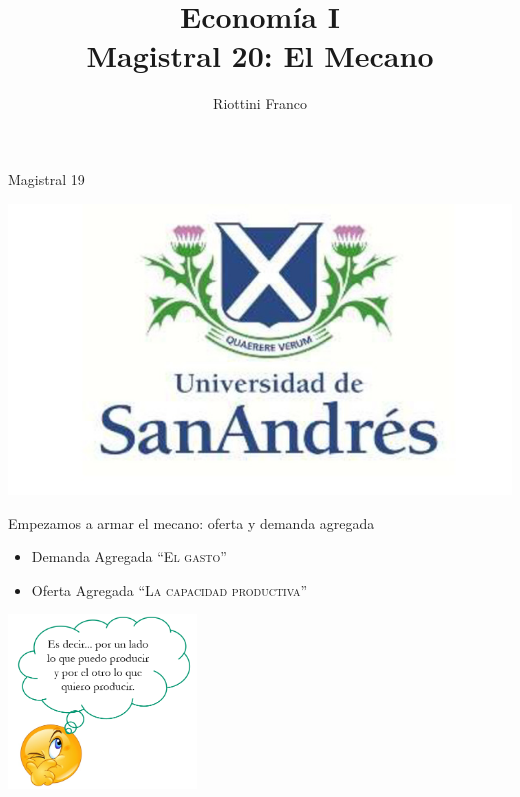 \documentclass{beamer}
\title[Economía I]{Economía I \vspace{4mm}
\\ Magistral 20: El Mecano}
\date{}
\author[Riottini]{Riottini Franco}
\institute[]{Universidad de San Andrés}
\begin{document}
\begin{frame}
\titlepage
\centering
Magistral 19

\includegraphics[scale=0.2]{../Figures/logoUDESA.jpg} 
\end{frame}


\begin{frame}{Empezamos a armar el mecano: oferta y demanda agregada}

    \begin{itemize}
        \item Demanda Agregada \textsc{“El gasto”} \faCartPlus
        \item Oferta Agregada \textsc{“La capacidad productiva”} \faIndustry
    \end{itemize}
    
    \centering\includegraphics[width=5cm]{../Figures/P17b.png}\
\end{frame}
\end{document}
